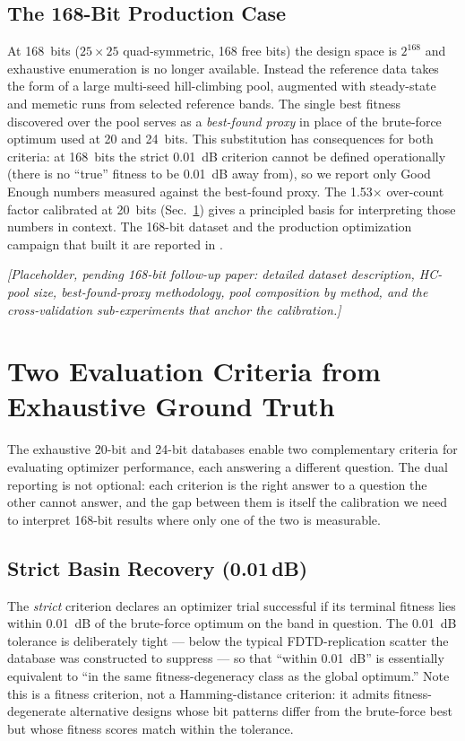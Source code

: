 \subsection{The 168-Bit Production Case}

At 168~bits ($25 \times 25$ quad-symmetric, 168 free bits) the
design space is $2^{168}$ and exhaustive enumeration is no longer
available. Instead the reference data takes the form of a large
multi-seed hill-climbing pool, augmented with steady-state and
memetic runs from selected reference bands. The single best fitness
discovered over the pool serves as a \emph{best-found proxy} in
place of the brute-force optimum used at 20 and 24~bits. This
substitution has consequences for both criteria: at 168~bits the
strict 0.01~dB criterion cannot be defined operationally (there is
no ``true'' fitness to be 0.01~dB away from), so we report only
Good Enough numbers measured against the best-found proxy. The
1.53$\times$ over-count factor calibrated at 20~bits
(Sec.~\ref{app:criteria}) gives a principled basis for interpreting
those numbers in context. The 168-bit dataset and the production
optimization campaign that built it are reported in
\cite{Maloney2026Paper3}.

\noindent\textit{[Placeholder, pending 168-bit follow-up paper:
detailed dataset description, HC-pool size, best-found-proxy
methodology, pool composition by method, and the cross-validation
sub-experiments that anchor the calibration.]}

\section{Two Evaluation Criteria from Exhaustive Ground Truth}
\label{app:criteria}

The exhaustive 20-bit and 24-bit databases enable two complementary
criteria for evaluating optimizer performance, each answering a
different question. The dual reporting is not optional: each
criterion is the right answer to a question the other cannot answer,
and the gap between them is itself the calibration we need to
interpret 168-bit results where only one of the two is measurable.

\subsection{Strict Basin Recovery (0.01\,dB)}

The \emph{strict} criterion declares an optimizer trial successful
if its terminal fitness lies within 0.01~dB of the brute-force
optimum on the band in question. The 0.01~dB tolerance is
deliberately tight --- below the typical FDTD-replication scatter
the database was constructed to suppress --- so that ``within 0.01~dB''
is essentially equivalent to ``in the same fitness-degeneracy
class as the global optimum.'' Note this is a fitness criterion,
not a Hamming-distance criterion: it admits fitness-degenerate
alternative designs whose bit patterns differ from the brute-force
best but whose fitness scores match within the tolerance.

